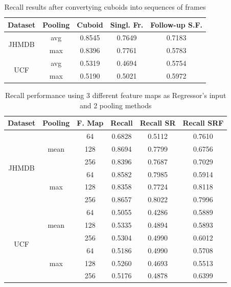 \en
\begin{table}[h]
  \en
  \centering
  \begin{tabular} {||c | c || c | c | c ||}
    \hline
    \textbf{Dataset} & \textbf{Pooling} & \textbf{Cuboid} & \textbf{Singl. Fr. } &  \textbf{Follow-up S.F.}\\
    \hline                
    \multirow{2}{*}{JHMDB} & avg & 0.8545 & 0.7649 & 0.7183 \\
    \cline{2-5}
    {} & max & 0.8396 & 0.7761 & 0.5783 \\
    \cline{1-5}
    \multirow{2}{*}{UCF} & avg & 0.5319 & 0.4694 & 0.5754 \\
    \cline{2-5}
    {} & max & 0.5190 & 0.5021 & 0.5972 \\
    \cline{1-5}
                                   
  \end{tabular}
  \caption{\en Recall results after convertying cuboids into sequences of frames}
  \label{table:gr_reg_1_1}
\end{table}
\gr
\en
\begin{table}[h]
  \en
  \centering
  \begin{tabular}{||c | c | c || c  c  c ||}
    \hline
    \textbf{Dataset} & \textbf{Pooling} & \textbf{F. Map} & \textbf{Recall} &  \textbf{ Recall SR}  &  \textbf{Recall SRF} \\
    \hline
    \multirow{6}{*}{JHMDB} & \multirow{3}{*}{mean} & 64 &  0.6828  & 0.5112  & 0.7610 \\
    \cline{3-6}
    {} & {} & 128 & 0.8694 & 0.7799 & 0.6756 \\
    \cline{3-6}
    {} & {} & 256 & 0.8396 & 0.7687 & 0.7029 \\
    \cline{2-6}
    {} & \multirow{3}{*}{max} & 64 &  0.8582 & 0.7985 & 0.5914\\
    \cline{3-6}
    {} & {} & 128 & 0.8358 & 0.7724 & 0.8118 \\
    \cline{3-6}
    {} & {} & 256 & 0.8657 & 0.8022 & 0.7996 \\
    \hline
    \multirow{6}{*}{UCF} & \multirow{3}{*}{mean} & 64 & 0.5055 & 0.4286 & 0.5889 \\
    \cline{3-6}
    {} & {} & 128 & 0.5335 & 0.4894 & 0.5893 \\
    \cline{3-6}
    {} & {} & 256 & 0.5304 & 0.4990 & 0.6012 \\
    \cline{2-6}
    {} & \multirow{3}{*}{max} & 64 & 0.5186 & 0.4990 & 0.5708 \\
    \cline{3-6}
    {} & {} & 128 & 0.5260 & 0.4693 & 0.5513 \\
    \cline{3-6}
    {} & {} & 256 & 0.5176 & 0.4878 & 0.6399 \\
    \hline

  \end{tabular}
  \caption{\en Recall performance using 3 different feature maps as Regressor's input and 2 pooling methods}
  \label{table:gr_reg_1_2}
\end{table}
